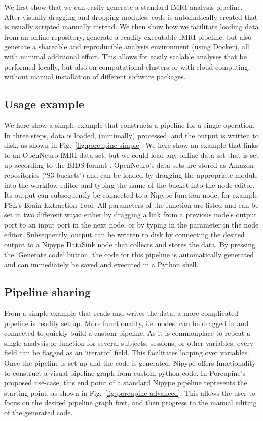 We first show that we can easily generate a standard fMRI analysis pipeline. After visually dragging and dropping modules, code is automatically created that is usually scripted manually instead. We then show how we facilitate loading data from an online repository, generate a readily executable fMRI pipeline, but also generate a shareable and reproducible analysis environment (using Docker), all with minimal additional effort. This allows for easily scalable analyses that  be performed locally, but also on computational clusters or with cloud computing, without manual installation of different software packages. 

\subsection{Usage example}
We here show a simple example that constructs a pipeline for a single operation. In three steps, data is loaded, (minimally) processed, and the output is written to disk, as shown in Fig.~\ref{fig:porcupine-simple}. We here show an example that links to an OpenNeuro fMRI data set, but we could load any online data set that is set up according to the BIDS format \cite{Gorgolewski2016}. OpenNeuro's data sets are stored as Amazon repositories (`S3 buckets') and can be loaded by dragging the appropriate module into the workflow editor and typing the name of the bucket into the node editor. Its output can subsequently be connected to a Nipype function node, for example FSL's Brain Extraction Tool. All parameters of the function are listed and can be set in two different ways: either by dragging a link from a previous node's output port to an input port in the next node, or by typing in the parameter in the node editor. Subsequently, output can be written to disk by connecting the desired output to a Nipype DataSink node that collects and stores the data. By pressing the `Generate code` button, the code for this pipeline is automatically generated and can immediately be saved and executed in a Python shell.


\subsection{Pipeline sharing}
From a simple example that reads and writes the data, a more complicated pipeline is readily set up. More functionality, i.e. nodes, can be dragged in and connected to quickly build a custom pipeline. As it is commonplace to repeat a single analysis or function for several subjects, sessions, or other variables, every field can be flagged as an `iterator' field. This facilitates looping over variables. Once the pipeline is set up and the code is generated, Nipype offers functionality to construct a visual pipeline graph from custom python code. In Porcupine's proposed use-case, this end point of a standard Nipype pipeline represents the starting point, as shown in Fig.~\ref{fig:porcupine-advanced}. This allows the user to focus on the desired pipeline graph first, and then progress to the manual editing of the generated code.


